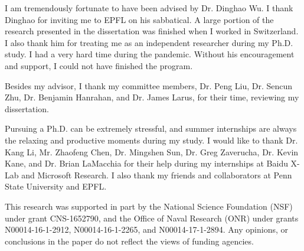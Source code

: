 I am tremendously fortunate to have been advised by Dr. Dinghao Wu.  I thank Dinghao for inviting me to EPFL on his sabbatical. A large portion of the research presented in the dissertation was finished when I worked in Switzerland. I also thank him for treating me as an independent researcher during my Ph.D. study. I had a very hard time during the pandemic. Without his encouragement and support, I could not have finished the program.

Besides my advisor, I thank my committee members, Dr. Peng Liu, Dr. Sencun Zhu, Dr. Benjamin Hanrahan, and Dr. James Larus, for their time, reviewing my dissertation. 

Pursuing a Ph.D. can be extremely stressful, and summer internships are always the relaxing and productive moments during my study. I would like to thank Dr. Kang Li, Mr. Zhaofeng Chen, Dr. Mingshen Sun, Dr. Greg Zaverucha, Dr. Kevin Kane, and Dr. Brian LaMacchia for their help during my internships at Baidu X-Lab and Microsoft Research.  I also thank my friends and collaborators at Penn State University and EPFL. 

This research was supported in part by the National Science Foundation (NSF) under grant CNS-1652790, and the Office of Naval Research (ONR) under grants N00014-16-1-2912, N00014-16-1-2265, and N00014-17-1-2894. Any opinions, or conclusions in the paper do not reflect the views of funding agencies.

